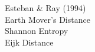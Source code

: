 \documentclass[preview]{standalone}
\begin{document}
Esteban & Ray (1994)\\Earth Mover's Distance\\Shannon Entropy\\Eijk Distance\\
\end{document}
